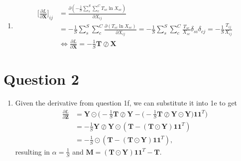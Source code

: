 \documentclass[11pt]{article}
\begin{document}
\begin{enumerate}[label=1\alph*]
\item
\begin{align*}
  {\Big[\frac{\partial L}{\partial \mathbf{X}}\Big]}_{ij} &=
                                              \frac{\partial(-\frac{1}{S}\sum_s^S\sum_c^C
                                              T_{sc}\ln X_{sc})}{\partial
                                              X_{ij}} \\
                                            &=
                                              -\frac{1}{S}\sum_s^S\sum_c^C
                                              \frac{\partial{(T_{sc}\ln
                                              X_{sc})}}{\partial X_{ij}} =
                                              -\frac{1}{S}\sum_s^S\sum_c^C
                                              \frac{T_{sc}}{X_{sc}}\delta_{si}\delta_{cj}
                                              =
                                              -\frac{1}{S}\frac{T_{ij}}{X_{ij}}\\
  &\Leftrightarrow \frac{\partial L}{\partial \mathbf{X}} = -\frac{1}{S}\mathbf{T} \oslash \mathbf{X}
\end{align*}
\end{enumerate}

\section*{Question 2}

\begin{enumerate}[label=2\alph*]
\item
  Given the derivative from question 1f, we can substitute it into 1e
  to get
  \begin{align*}
    \frac{\partial L}{\partial \mathbf{Z}} &= \mathbf{Y}\odot{\Big(-\frac{1}{S}\mathbf{T} \oslash
                               \mathbf{Y}-\Big(-\frac{1}{S}\mathbf{T} \oslash
                               \mathbf{Y}\odot\mathbf{Y}\Big)\mathbf{1}\mathbf{1}^T\Big)}\\
    &=
      -\frac{1}{S}\mathbf{Y}\oslash\mathbf{Y}\odot(\mathbf{T}-(\mathbf{T}\odot\mathbf{Y})\mathbf{1}\mathbf{1}^T)\\
    &=
      -\frac{1}{S}\odot(\mathbf{T}-(\mathbf{T}\odot\mathbf{Y})\mathbf{1}\mathbf{1}^T),
  \end{align*}
  resulting in $\alpha=\frac{1}{S}$ and
  $\mathbf{M}=(\mathbf{T}\odot\mathbf{Y})\mathbf{1}\mathbf{1}^T-\mathbf{T}$.

\end{enumerate}
\end{document}
